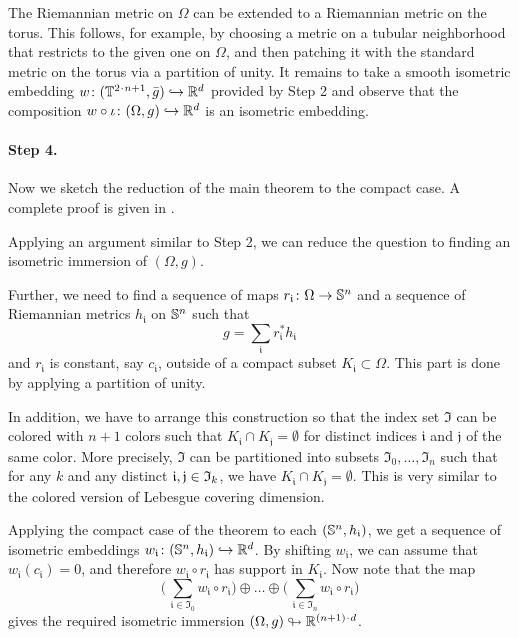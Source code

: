 The Riemannian metric on $\Omega$ can be extended to a Riemannian metric on the torus.
This follows, for example, by choosing a metric on a tubular neighborhood that restricts to the given one on \(\Omega\), and then patching it with the standard metric on the torus via a partition of unity.
It remains to take a smooth isometric embedding $w\colon (\TT^{2\cdot n+1}, \bar g) \z\hookrightarrow \RR^d$ provided by Step 2 and observe that the composition $w \circ \iota\colon(\Omega, g) \z\hookrightarrow \RR^d$ is an isometric embedding.

\paragraph{Step 4.}
Now we sketch the reduction of the main theorem to the compact case.
A complete proof is given in \cite[Part~D]{nash-1956}.

Applying an argument similar to Step 2, we can reduce the question to finding an isometric immersion of $(\Omega,g)$.

Further, we need to find a sequence of maps $r_{\mathfrak{i}}\colon\Omega \to \mathbb{S}^n$ and a sequence of Riemannian metrics $h_{\mathfrak{i}}$ on $\mathbb{S}^n$ such that
\[g=\sum_{\mathfrak{i}} r_{\mathfrak{i}}^*h_{\mathfrak{i}}\]
and $r_{\mathfrak{i}}$ is constant, say $c_{\mathfrak{i}}$, outside of a compact subset $K_{\mathfrak{i}}\subset \Omega$.
This part is done by applying a partition of unity.

In addition, we have to arrange this construction so that the index set $\mathfrak{I}$ can be colored with $n+1$ colors such that $K_{\mathfrak{i}}\cap K_{\mathfrak{j}}=\emptyset$ for distinct indices $\mathfrak{i}$ and $\mathfrak{j}$ of the same color.
More precisely, $\mathfrak{I}$ can be partitioned into subsets $\mathfrak{I}_0, \dots, \mathfrak{I}_n$ such that for any $k$ and any distinct $\mathfrak{i}, \mathfrak{j} \z\in \mathfrak{I}_k$, we have
$K_{\mathfrak{i}} \cap K_{\mathfrak{j}} = \emptyset$.
This is very similar to the colored version of Lebesgue covering dimension.

Applying the compact case of the theorem to each $(\mathbb{S}^n,h_{\mathfrak{i}})$, we get a sequence of isometric embeddings $w_{\mathfrak{i}}\colon(\mathbb{S}^n,h_{\mathfrak{i}})\hookrightarrow \mathbb{R}^d$.
By shifting $w_{\mathfrak{i}}$, we can assume that $w_{\mathfrak{i}}(c_{\mathfrak{i}})=0$, and therefore $w_{\mathfrak{i}}\circ r_{\mathfrak{i}}$ has support in $K_{\mathfrak{i}}$.
Now note that the map
\[\biggl(\,\sum_{\mathfrak{i}\in \mathfrak{I}_0}w_{\mathfrak{i}}\circ r_{\mathfrak{i}}\biggr)\oplus\dots\oplus
\biggl(\,\sum_{\mathfrak{i}\in \mathfrak{I}_n}w_{\mathfrak{i}}\circ r_{\mathfrak{i}}\biggr)\]
gives the required isometric immersion $(\Omega,g)\looparrowright \RR^{(n+1)\cdot d}$.

